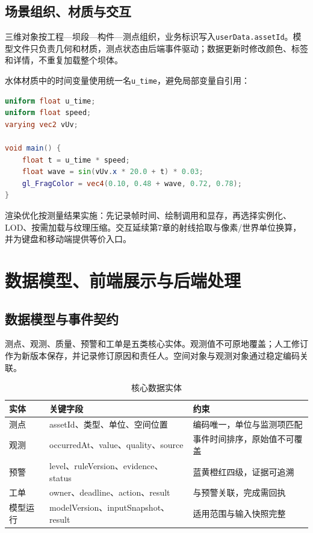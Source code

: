 \subsection{场景组织、材质与交互}

三维对象按工程—坝段—构件—测点组织，业务标识写入\texttt{userData.assetId}。模型文件只负责几何和材质，测点状态由后端事件驱动；数据更新时修改颜色、标签和详情，不重复加载整个坝体。

水体材质中的时间变量使用统一名\texttt{u\_time}，避免局部变量自引用：

\begin{lstlisting}[language=GLSL]
uniform float u_time;
uniform float speed;
varying vec2 vUv;

void main() {
    float t = u_time * speed;
    float wave = sin(vUv.x * 20.0 + t) * 0.03;
    gl_FragColor = vec4(0.10, 0.48 + wave, 0.72, 0.78);
}
\end{lstlisting}

渲染优化按测量结果实施：先记录帧时间、绘制调用和显存，再选择实例化、LOD、按需加载与纹理压缩。交互延续第7章的射线拾取与像素/世界单位换算，并为键盘和移动端提供等价入口。

\section{数据模型、前端展示与后端处理}

\subsection{数据模型与事件契约}

测点、观测、质量、预警和工单是五类核心实体。观测值不可原地覆盖；人工修订作为新版本保存，并记录修订原因和责任人。空间对象与观测对象通过稳定编码关联。

\begin{table}[htbp]
\centering
\caption{核心数据实体}
\label{tab:case-core-data}
\begin{tabular}{p{2.4cm}p{4.5cm}p{5.5cm}}
\toprule
实体 & 关键字段 & 约束 \\
\midrule
测点 & assetId、类型、单位、空间位置 & 编码唯一，单位与监测项匹配 \\
观测 & occurredAt、value、quality、source & 事件时间排序，原始值不可覆盖 \\
预警 & level、ruleVersion、evidence、status & 蓝黄橙红四级，证据可追溯 \\
工单 & owner、deadline、action、result & 与预警关联，完成需回执 \\
模型运行 & modelVersion、inputSnapshot、result & 适用范围与输入快照完整 \\
\bottomrule
\end{tabular}
\end{table}

